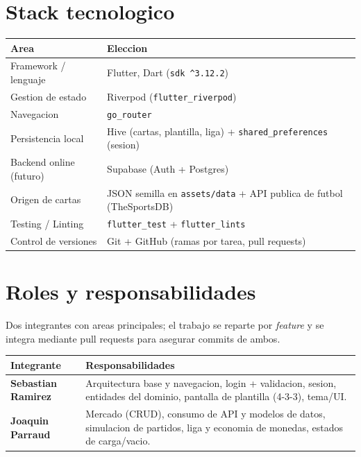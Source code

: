 \documentclass[11pt,a4paper]{article}
\begin{document}
\section{Stack tecnologico}
\renewcommand{\arraystretch}{1.3}
\begin{tabularx}{\textwidth}{@{}L{4.2cm} X@{}}
\toprule
\textbf{Area} & \textbf{Eleccion} \\
\midrule
Framework / lenguaje & Flutter, Dart (\texttt{sdk \^{}3.12.2}) \\
Gestion de estado    & Riverpod (\texttt{flutter\_riverpod}) \\
Navegacion           & \texttt{go\_router} \\
Persistencia local   & Hive (cartas, plantilla, liga) + \texttt{shared\_preferences} (sesion) \\
Backend online (futuro) & Supabase (Auth + Postgres) \\
Origen de cartas     & JSON semilla en \texttt{assets/data} + API publica de futbol (TheSportsDB) \\
Testing / Linting    & \texttt{flutter\_test} + \texttt{flutter\_lints} \\
Control de versiones & Git + GitHub (ramas por tarea, pull requests) \\
\bottomrule
\end{tabularx}

\section{Roles y responsabilidades}
Dos integrantes con areas principales; el trabajo se reparte por \emph{feature} y se
integra mediante pull requests para asegurar commits de ambos.

\renewcommand{\arraystretch}{1.3}
\begin{tabularx}{\textwidth}{@{}L{4cm} X@{}}
\toprule
\textbf{Integrante} & \textbf{Responsabilidades} \\
\midrule
\textbf{Sebastian Ramirez} & Arquitectura base y navegacion, login + validacion,
sesion, entidades del dominio, pantalla de plantilla (4-3-3), tema/UI. \\
\addlinespace
\textbf{Joaquin Parraud} & Mercado (CRUD), consumo de API y modelos de datos,
simulacion de partidos, liga y economia de monedas, estados de carga/vacio. \\
\bottomrule
\end{tabularx}
\end{document}
